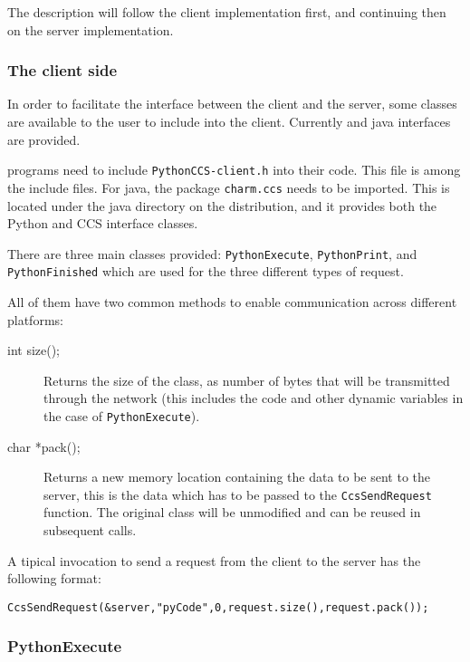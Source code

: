 The description will follow the client implementation first, and continuing then
on the server implementation.


\subsubsection{The client side}

\label{pythonClient}

In order to facilitate the interface between the client and the server, some
classes are available to the user to include into the client. Currently \CC{} and
java interfaces are provided.

\CC{} programs need to include \texttt{PythonCCS-client.h} into their
code. This file is among the \charmpp{} include files. For java, the package
\texttt{charm.ccs} needs to be imported. This is located under the java
directory on the \charmpp{} distribution, and it provides both the Python and
CCS interface classes.

There are three main classes provided: \texttt{PythonExecute},
\texttt{PythonPrint}, and \texttt{PythonFinished} which are used for the three
different types of request.

All of them have two common methods to enable communication across different platforms:

\begin{description}

\item[int size();]
Returns the size of the class, as number of bytes that will be
transmitted through the network (this includes the code and other dynamic
variables in the case of \texttt{PythonExecute}).

\item[char *pack();]
Returns a new memory location containing the data to be sent to the server, this
is the data which has to be passed to the \texttt{CcsSendRequest} function. The
original class will be unmodified and can be reused in subsequent calls.

\end{description}

A tipical invocation to send a request from the client to the server has the
following format:

\begin{alltt}
CcsSendRequest (&server, "pyCode", 0, request.size(), request.pack());
\end{alltt}

\subsubsection{PythonExecute}

